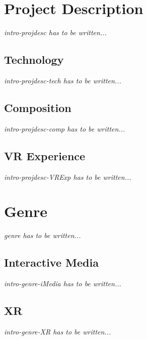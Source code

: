 \documentclass[letterpaper, openright]{report}
\begin{document}
    \section{Project Description} %
	\label{sub:instro-projdesc}
\textit{intro-projdesc has to be written...}	

			\subsection{Technology} %
			\label{subsub:intro-projdesc-tech}       
\textit{intro-projdesc-tech has to be written...}	

			\subsection{Composition} %
			\label{subsub:intro-projdesc-comp}
\textit{intro-projdesc-comp has to be written...}

			\subsection{\ac{VR} Experience} %
			\label{subsub:intro-projdesc-VR_Exp}
\textit{intro-projdesc-VRExp has to be written...}	
            

    \section{Genre} %
	\label{sub:genre}
\textit{genre has to be written...}

			\subsection{Interactive Media} %
			\label{subsub:intro-genre-iMedia}
\textit{intro-genre-iMedia has to be written...}

			\subsection{\ac{XR}} %
			\label{subsub:intro-genre-XR}
\textit{intro-genre-XR has to be written...}
            
\end{document}
